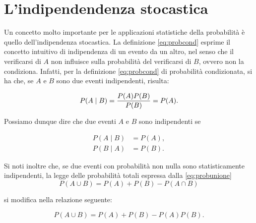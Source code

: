 \documentclass[
  11pt,
]{krantz}
\theoremstyle{definition}
\theoremstyle{definition}
\theoremstyle{definition}
\theoremstyle{definition}
\theoremstyle{remark}
\begin{document}
\hypertarget{lindipendendenza-stocastica}{%
\section{L'indipendendenza stocastica}\label{lindipendendenza-stocastica}}

Un concetto molto importante per le applicazioni statistiche della probabilità è quello dell'indipendenza stocastica. La definizione \eqref{eq:probcond} esprime il concetto intuitivo di indipendenza di un evento da un altro, nel senso che il verificarsi di \(A\) non influisce sulla probabilità del verificarsi di \(B\), ovvero non la condiziona. Infatti, per la definizione \eqref{eq:probcond} di probabilità condizionata, si ha che, se \(A\) e \(B\) sono due eventi indipendenti, risulta:

\[
P(A \mid B) = \frac{P(A)P(B)}{P(B)} = P(A).\notag
\]

Possiamo dunque dire che due eventi \(A\) e \(B\) sono indipendenti se

\[
\begin{split}
P(A \mid B) &= P(A), \\
P(B \mid A) &= P(B).
\end{split}
\]

Si noti inoltre che, se due eventi con probabilità non nulla sono statisticamente indipendenti, la legge delle probabilità totali espressa dalla \eqref{eq:probunione} \begin{equation}
P(A \cup B) = P(A) + P(B) - P(A \cap B)
\label{eq:probunione}
\end{equation}

si modifica nella relazione seguente:

\begin{equation}
P(A \cup B) = P(A) + P(B) - P(A)P(B).
\end{equation}
\end{document}
